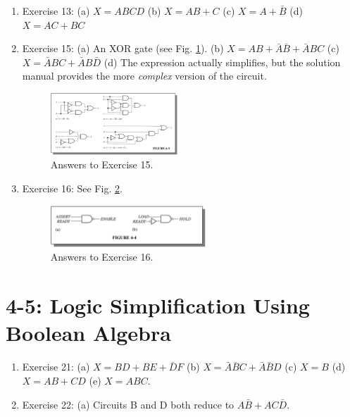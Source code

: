 \documentclass[10pt]{article}
\begin{document}
\begin{enumerate}
\item Exercise 13: (a) $X = ABCD$ (b) $X = AB+C$ (c) $X = A+\bar{B}$ (d) $X = AC+BC$
\item Exercise 15: (a) An XOR gate (see Fig. \ref{fig:ex15}). (b) $X = AB+\bar{A}\bar{B}+\bar{A}BC$ (c) $X = \bar{A}BC+\bar{A}B\bar{D}$ (d) The expression actually simplifies, but the solution manual provides the more \textit{complex} version of the circuit.
\begin{figure}[hb]
\centering
\includegraphics[width=0.45\textwidth]{ex15.png}
\caption{\label{fig:ex15} Answers to Exercise 15.}
\end{figure}
\item Exercise 16: See Fig. \ref{fig:ex16}.
\begin{figure}[ht]
\centering
\includegraphics[width=0.55\textwidth]{ex16.png}
\caption{\label{fig:ex16} Answers to Exercise 16.}
\end{figure}
\end{enumerate}

\section{4-5: Logic Simplification Using Boolean Algebra}

\begin{enumerate}
\item Exercise 21: (a) $X = BD + BE + \bar{D}F$ (b) $X = \bar{A}\bar{B}C + \bar{A}\bar{B}D$ (c) $X = B$ (d) $X = AB + CD$ (e) $X = ABC$.
\item Exercise 22: (a) Circuits B and D both reduce to $A\bar{B} + AC\bar{D}$.
\end{enumerate}
\end{document}
